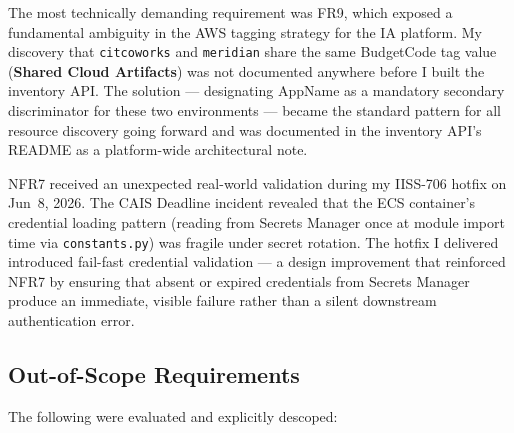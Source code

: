 The most technically demanding requirement was FR9, which exposed a
fundamental ambiguity in the AWS tagging strategy for the IA platform.
My discovery that \texttt{citcoworks} and \texttt{meridian} share the
same BudgetCode tag value (\textbf{Shared Cloud Artifacts})
was not documented anywhere before I built the inventory API. The
solution --- designating AppName as a mandatory secondary
discriminator for these two environments --- became the standard pattern
for all resource discovery going forward and was documented in the
inventory API's README as a platform-wide architectural note.

NFR7 received an unexpected real-world validation during my
IISS-706 hotfix on Jun~8, 2026. The CAIS Deadline incident revealed
that the ECS container's credential loading pattern (reading from
Secrets Manager once at module import time via \texttt{constants.py})
was fragile under secret rotation. The hotfix I delivered introduced fail-fast
credential validation --- a design improvement that reinforced NFR7
by ensuring that absent or expired credentials from Secrets Manager
produce an immediate, visible failure rather than a silent downstream
authentication error.

\subsection{Out-of-Scope Requirements}

The following were evaluated and explicitly descoped:

